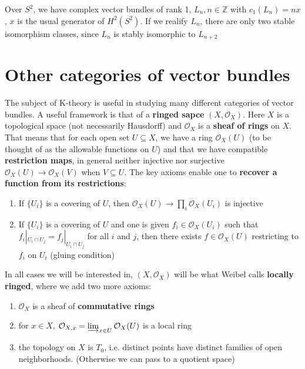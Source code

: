 \documentclass[main]{subfiles}
\begin{document}
\begin{example}
Over $S^2$, we have complex vector bundles of rank 1, $L_n,n\in\mathbb Z$ with $c_1(L_n)=nx$, $x$ is the usual generator of $H^2(S^2)$. If we realify $L_n$, there are only two stable isomorphism classes, since $L_n$ is stably isomorphic to $L_{n+2}$
\end{example}

\section{Other categories of vector bundles}

The subject of K-theory is useful in studying many different categories of vector bundles. A useful framework is that of a \textbf{ringed sapce} $(X,\mathcal O_X)$. Here $X$ is a topological space (not necessarily Hausdorff) and $\mathcal O_X$ is a \textbf{sheaf of rings} on $X$. That means that for each open set $U\subseteq X$, we have a ring $\mathcal O_X(U)$ (to be thought of as the allowable functions on $U$) and that we have compatible \textbf{restriction maps}, in general neither injective nor surjective $\mathcal O_X(U)\to\mathcal O_X(V)$ when $V\subseteq U$. The key axioms enable one to \textbf{recover a function from its restrictions}:
\begin{enumerate}
\item If $\{U_i\}$ is a covering of $U$, then $\mathcal O_X(U)\to\prod_i\mathcal O_X(U_i)$ is injective
\item If $\{U_i\}$ is a covering of $U$ and one is given $f_i\in\mathcal O_X(U_i)$ such that $f_i|_{U_i\cap U_j}=f_j|_{U_i\cap U_j}$ for all $i$ and $j$, then there exists $f\in\mathcal O_X(U)$ restricting to $f_i$ on $U_i$ (gluing condition)
\end{enumerate}
In all cases we will be interested in, $(X,\mathcal O_X)$ will be what Weibel calls \textbf{locally ringed}, where we add two more axioms:
\begin{enumerate}
\item $\mathcal O_X$ is a sheaf of \textbf{commutative rings}
\item for $x\in X$, $\mathcal O_{X,x}=\varinjlim_{x\in U}\mathcal O_X(U)$ is a local ring
\item the topology on $X$ is $T_0$, i.e. distinct points have distinct families of open neighborhoods. (Otherwise we can pass to a quotient space)
\end{enumerate}
\end{document}

